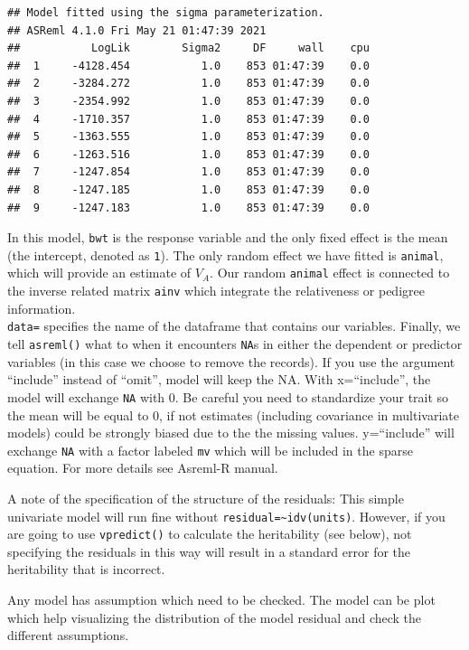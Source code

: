 \documentclass[
  12pt,
]{book}
\begin{document}
\begin{verbatim}
## Model fitted using the sigma parameterization.
## ASReml 4.1.0 Fri May 21 01:47:39 2021
##           LogLik        Sigma2     DF     wall    cpu
##  1     -4128.454           1.0    853 01:47:39    0.0
##  2     -3284.272           1.0    853 01:47:39    0.0
##  3     -2354.992           1.0    853 01:47:39    0.0
##  4     -1710.357           1.0    853 01:47:39    0.0
##  5     -1363.555           1.0    853 01:47:39    0.0
##  6     -1263.516           1.0    853 01:47:39    0.0
##  7     -1247.854           1.0    853 01:47:39    0.0
##  8     -1247.185           1.0    853 01:47:39    0.0
##  9     -1247.183           1.0    853 01:47:39    0.0
\end{verbatim}

In this model, \texttt{bwt} is the response variable and the only fixed effect is the mean (the intercept, denoted as \texttt{1}). The only random effect we have fitted is \texttt{animal}, which will provide an estimate of \(V_A\). Our random \texttt{animal} effect is connected to the inverse related matrix \texttt{ainv} which integrate the relativeness or pedigree information.\\
\texttt{data=} specifies the name of the dataframe that contains our variables. Finally, we tell \texttt{asreml()} what to when it encounters \texttt{NA}s in either the dependent or predictor variables (in this case we choose to remove the records). If you use the argument ``include'' instead of ``omit'', model will keep the NA. With x=``include'', the model will exchange \texttt{NA} with 0. Be careful you need to standardize your trait so the mean will be equal to 0, if not estimates (including covariance in multivariate models) could be strongly biased due to the the missing values. y=``include'' will exchange \texttt{NA} with a factor labeled \texttt{mv} which will be included in the sparse equation. For more details see Asreml-R manual.

A note of the specification of the structure of the residuals: This simple univariate model will run fine without \texttt{residual=\textasciitilde{}idv(units)}. However, if you are going to use \texttt{vpredict()} to calculate the heritability (see below), not specifying the residuals in this way will result in a standard error for the heritability that is incorrect.

Any model has assumption which need to be checked. The model can be plot which help visualizing the distribution of the model residual and check the different assumptions.
\end{document}
